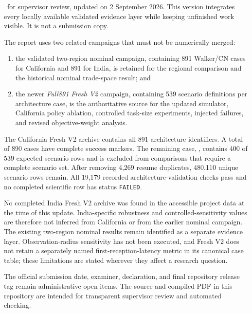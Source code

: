 \workingdraft\ for supervisor review, updated on 2 September 2026. This version integrates every locally available validated evidence layer while keeping unfinished work visible. It is not a submission copy.

The report uses two related campaigns that must not be numerically merged:
\begin{enumerate}
\item the validated two-region nominal campaign, containing 891 Walker/CN cases for California and 891 for India, is retained for the regional comparison and the historical nominal trade-space result; and
\item the newer \textit{Full891 Fresh V2} campaign, containing 539 scenario definitions per architecture case, is the authoritative source for the updated simulator, California policy ablation, controlled task-size experiments, injected failures, and revised objective-weight analysis.
\end{enumerate}

The California Fresh V2 archive contains all 891 architecture identifiers. A total of 890 cases have complete success markers. The remaining case, , contains 400 of 539 expected scenario rows and is excluded from comparisons that require a complete scenario set. After removing 4,269 resume duplicates, 480,110 unique scenario rows remain. All 19,179 recorded architecture-validation checks pass and no completed scientific row has status \texttt{FAILED}.

No completed India Fresh V2 archive was found in the accessible project data at the time of this update. India-specific robustness and controlled-sensitivity values are therefore not inferred from California or from the earlier nominal campaign. The existing two-region nominal results remain identified as a separate evidence layer. Observation-radius sensitivity has not been executed, and Fresh V2 does not retain a separately named first-reception-latency metric in its canonical case table; these limitations are stated wherever they affect a research question.

The official submission date, examiner, declaration, and final repository release tag remain administrative open items. The source and compiled PDF in this repository are intended for transparent supervisor review and automated checking.
